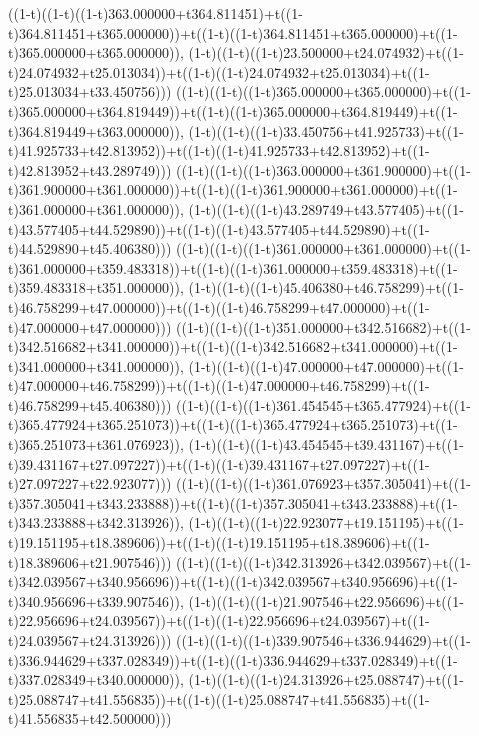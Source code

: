 ((1-t)((1-t)((1-t)363.000000+t364.811451)+t((1-t)364.811451+t365.000000))+t((1-t)((1-t)364.811451+t365.000000)+t((1-t)365.000000+t365.000000)),                                     (1-t)((1-t)((1-t)23.500000+t24.074932)+t((1-t)24.074932+t25.013034))+t((1-t)((1-t)24.074932+t25.013034)+t((1-t)25.013034+t33.450756)))
((1-t)((1-t)((1-t)365.000000+t365.000000)+t((1-t)365.000000+t364.819449))+t((1-t)((1-t)365.000000+t364.819449)+t((1-t)364.819449+t363.000000)),                                     (1-t)((1-t)((1-t)33.450756+t41.925733)+t((1-t)41.925733+t42.813952))+t((1-t)((1-t)41.925733+t42.813952)+t((1-t)42.813952+t43.289749)))
((1-t)((1-t)((1-t)363.000000+t361.900000)+t((1-t)361.900000+t361.000000))+t((1-t)((1-t)361.900000+t361.000000)+t((1-t)361.000000+t361.000000)),                                     (1-t)((1-t)((1-t)43.289749+t43.577405)+t((1-t)43.577405+t44.529890))+t((1-t)((1-t)43.577405+t44.529890)+t((1-t)44.529890+t45.406380)))
((1-t)((1-t)((1-t)361.000000+t361.000000)+t((1-t)361.000000+t359.483318))+t((1-t)((1-t)361.000000+t359.483318)+t((1-t)359.483318+t351.000000)),                                     (1-t)((1-t)((1-t)45.406380+t46.758299)+t((1-t)46.758299+t47.000000))+t((1-t)((1-t)46.758299+t47.000000)+t((1-t)47.000000+t47.000000)))
((1-t)((1-t)((1-t)351.000000+t342.516682)+t((1-t)342.516682+t341.000000))+t((1-t)((1-t)342.516682+t341.000000)+t((1-t)341.000000+t341.000000)),                                     (1-t)((1-t)((1-t)47.000000+t47.000000)+t((1-t)47.000000+t46.758299))+t((1-t)((1-t)47.000000+t46.758299)+t((1-t)46.758299+t45.406380)))
((1-t)((1-t)((1-t)361.454545+t365.477924)+t((1-t)365.477924+t365.251073))+t((1-t)((1-t)365.477924+t365.251073)+t((1-t)365.251073+t361.076923)),                                     (1-t)((1-t)((1-t)43.454545+t39.431167)+t((1-t)39.431167+t27.097227))+t((1-t)((1-t)39.431167+t27.097227)+t((1-t)27.097227+t22.923077)))
((1-t)((1-t)((1-t)361.076923+t357.305041)+t((1-t)357.305041+t343.233888))+t((1-t)((1-t)357.305041+t343.233888)+t((1-t)343.233888+t342.313926)),                                     (1-t)((1-t)((1-t)22.923077+t19.151195)+t((1-t)19.151195+t18.389606))+t((1-t)((1-t)19.151195+t18.389606)+t((1-t)18.389606+t21.907546)))
((1-t)((1-t)((1-t)342.313926+t342.039567)+t((1-t)342.039567+t340.956696))+t((1-t)((1-t)342.039567+t340.956696)+t((1-t)340.956696+t339.907546)),                                     (1-t)((1-t)((1-t)21.907546+t22.956696)+t((1-t)22.956696+t24.039567))+t((1-t)((1-t)22.956696+t24.039567)+t((1-t)24.039567+t24.313926)))
((1-t)((1-t)((1-t)339.907546+t336.944629)+t((1-t)336.944629+t337.028349))+t((1-t)((1-t)336.944629+t337.028349)+t((1-t)337.028349+t340.000000)),                                     (1-t)((1-t)((1-t)24.313926+t25.088747)+t((1-t)25.088747+t41.556835))+t((1-t)((1-t)25.088747+t41.556835)+t((1-t)41.556835+t42.500000)))

